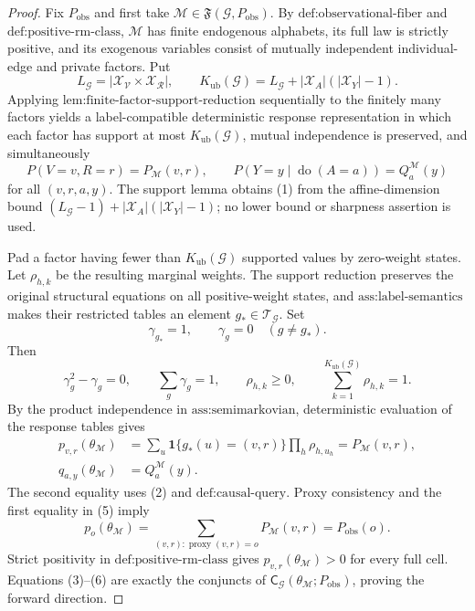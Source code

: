 \documentclass{article}
\begin{document}
\begin{proof}
Fix \(P_{\mathrm{obs}}\) and first take \(\mathcal M\in\mathfrak F(\mathcal G,P_{\mathrm{obs}})\). By \(\text{def:observational-fiber}\) and \(\text{def:positive-rm-class}\), \(\mathcal M\) has finite endogenous alphabets, its full law is strictly positive, and its exogenous variables consist of mutually independent individual-edge and private factors. Put
\[
L_{\mathcal G}=\left|\mathcal X_{\mathcal V}\times\mathcal X_{\mathcal R}\right|,
\qquad
K_{\mathrm{ub}}(\mathcal G)=L_{\mathcal G}+|\mathcal X_A|(|\mathcal X_Y|-1).
\tag{1}
\]
Applying \(\text{lem:finite-factor-support-reduction}\) sequentially to the finitely many factors yields a label-compatible deterministic response representation in which each factor has support at most \(K_{\mathrm{ub}}(\mathcal G)\), mutual independence is preserved, and simultaneously
\[
P(V=v,R=r)=P_{\mathcal M}(v,r),
\qquad
P(Y=y\mid\operatorname{do}(A=a))=Q_a^{\mathcal M}(y)
\tag{2}
\]
for all \((v,r,a,y)\). The support lemma obtains (1) from the affine-dimension bound \((L_{\mathcal G}-1)+|\mathcal X_A|(|\mathcal X_Y|-1)\); no lower bound or sharpness assertion is used.

Pad a factor having fewer than \(K_{\mathrm{ub}}(\mathcal G)\) supported values by zero-weight states. Let \(\rho_{h,k}\) be the resulting marginal weights. The support reduction preserves the original structural equations on all positive-weight states, and \(\text{ass:label-semantics}\) makes their restricted tables an element \(g_*\in\mathcal T_{\mathcal G}\). Set
\[
\gamma_{g_*}=1,
\qquad
\gamma_g=0\quad(g\neq g_*).
\tag{3}
\]
Then
\[
\gamma_g^2-\gamma_g=0,
\qquad
\sum_g\gamma_g=1,
\qquad
\rho_{h,k}\geq0,
\qquad
\sum_{k=1}^{K_{\mathrm{ub}}(\mathcal G)}\rho_{h,k}=1.
\tag{4}
\]
By the product independence in \(\text{ass:semimarkovian}\), deterministic evaluation of the response tables gives
\[
\begin{aligned}
p_{v,r}(\theta_{\mathcal M})
&=\sum_u\mathbf 1\{g_*(u)=(v,r)\}\prod_h\rho_{h,u_h}
=P_{\mathcal M}(v,r),\\
q_{a,y}(\theta_{\mathcal M})
&=Q_a^{\mathcal M}(y).
\end{aligned}
\tag{5}
\]
The second equality uses (2) and \(\text{def:causal-query}\). Proxy consistency and the first equality in (5) imply
\[
p_o(\theta_{\mathcal M})
=\sum_{(v,r):\operatorname{proxy}(v,r)=o}P_{\mathcal M}(v,r)
=P_{\mathrm{obs}}(o).
\tag{6}
\]
Strict positivity in \(\text{def:positive-rm-class}\) gives \(p_{v,r}(\theta_{\mathcal M})>0\) for every full cell. Equations (3)--(6) are exactly the conjuncts of \(\mathsf C_{\mathcal G}(\theta_{\mathcal M};P_{\mathrm{obs}})\), proving the forward direction.


\end{proof}
\end{document}
